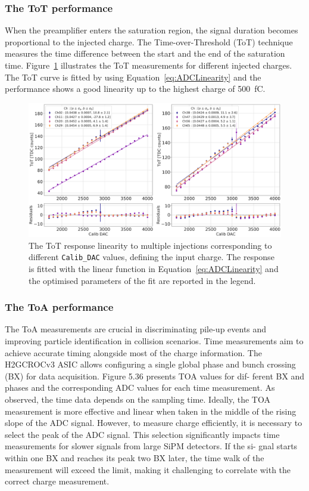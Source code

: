 \subsubsection{The ToT performance}
\label{subsubsec:The ToT performance}

When the preamplifier enters the saturation region, the signal duration becomes proportional to the injected charge. 
The Time-over-Threshold (ToT) technique measures the time difference between the start and the end of the saturation time. Figure~\ref{fig:TOT_Injection} illustrates the ToT measurements for different injected charges. The ToT curve is fitted by using Equation~\ref{eq:ADCLinearity} and the performance shows a good linearity up to the highest charge of 500~fC. 

\begin{figure}
    \centering
    \includegraphics[width=0.75\linewidth]{Figures/HGCAL/TOT_Injection.pdf}
    \caption{The ToT response linearity to multiple injections corresponding to different \texttt{Calib\_DAC} values, defining the input charge. The  response is fitted with the linear function in Equation~\ref{eq:ADCLinearity} and the optimised parameters of the fit are reported in the legend.}
    \label{fig:TOT_Injection}
\end{figure}

\subsubsection{The ToA performance}
\label{subsubsec:The ToA performance}

The ToA measurements are crucial in discriminating pile-up events and improving particle identification in collision scenarios. Time measurements aim to achieve accurate timing alongside most of the charge information. The H2GCROCv3 ASIC allows configuring a single global phase and bunch crossing (BX) for data acquisition. Figure 5.36 presents TOA values for dif- ferent BX and phases and the corresponding ADC values for each time measurement. As observed, the time data depends on the sampling time. Ideally, the TOA measurement is more effective and linear when taken in the middle of the rising slope of the ADC signal. However, to measure charge efficiently, it is necessary to select the peak of the ADC signal. This selection significantly impacts time measurements for slower signals from large SiPM detectors. If the si- gnal starts within one BX and reaches its peak two BX later, the time walk of the measurement will exceed the limit, making it challenging to correlate with the correct charge measurement.

